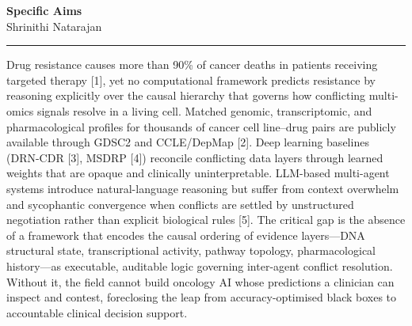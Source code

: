 \documentclass[11pt, letterpaper]{article}
\begin{document}

\begin{center}
    {\large\bfseries Specific Aims}\\[0.15em]
    {\small Shrinithi Natarajan}
\end{center}

\vspace{0.15em}
\hrule
\vspace{0.35em}

Drug resistance causes more than 90\% of cancer deaths in patients receiving targeted therapy [1],
yet no computational framework predicts resistance by reasoning explicitly over the causal hierarchy
that governs how conflicting multi-omics signals resolve in a living cell.
Matched genomic, transcriptomic, and pharmacological profiles for thousands of cancer cell
line--drug pairs are publicly available through GDSC2 and CCLE/DepMap [2].
Deep learning baselines (DRN-CDR [3], MSDRP [4]) reconcile conflicting data layers through
learned weights that are opaque and clinically uninterpretable.
LLM-based multi-agent systems introduce natural-language reasoning but suffer from context
overwhelm and sycophantic convergence when conflicts are settled by unstructured negotiation
rather than explicit biological rules [5].
The critical gap is the absence of a framework that encodes the causal ordering of evidence
layers---DNA structural state, transcriptional activity, pathway topology, pharmacological
history---as executable, auditable logic governing inter-agent conflict resolution.
Without it, the field cannot build oncology AI whose predictions a clinician can inspect and
contest, foreclosing the leap from accuracy-optimised black boxes to accountable clinical
decision support.
\end{document}
